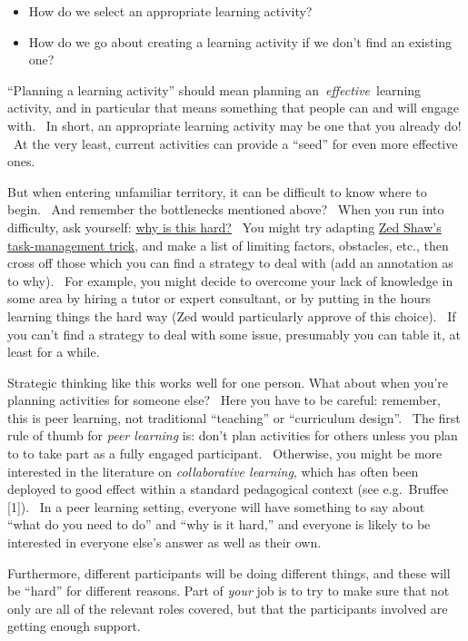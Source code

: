 \begin{itemize}
\tightlist
\item
  How do we select an appropriate learning activity?
\item
  How do we go about creating a learning activity if we don't find an
  existing one?
\end{itemize}

``Planning a learning activity'' should mean planning
an~\emph{effective}~learning activity, and in particular that means
something that people can and will engage with. ~In short, an
appropriate learning activity may be one that you already do! ~At the
very least, current activities can provide a ``seed'' for even more
effective ones.

But when entering unfamiliar territory, it can be difficult to know
where to begin.~ And remember the bottlenecks mentioned above?~ When you
run into difficulty, ask yourself:
\href{http://peeragogy.org/patterns-and-heuristics/}{why is this hard?}~
You might try adapting
\href{http://learnpythonthehardway.org/book/intro.html\#comment-409972596}{Zed
Shaw's task-management trick}, and make a list of limiting factors,
obstacles, etc., then cross off those which you can find a strategy to
deal with (add an annotation as to why). ~For example, you might decide
to overcome your lack of knowledge in some area by hiring a tutor or
expert consultant, or by putting in the hours learning things the hard
way (Zed would particularly approve of this choice).~ If you can't find
a strategy to deal with some issue, presumably you can table it, at
least for a while.

Strategic thinking like this works well for one person. What about when
you're planning activities for someone else? ~Here you have to be
careful: remember, this is peer learning, not traditional ``teaching''
or ``curriculum design''. ~The first rule of thumb for \emph{peer
learning} is: don't plan activities for others unless you plan to to
take part as a fully engaged participant.~ Otherwise, you might be more
interested in the literature on \emph{collaborative learning}, which has
often been deployed to good effect within a standard pedagogical context
(see e.g.~Bruffee {{[}1{]}}).~ In a peer learning setting, everyone will
have something to say about~ ``what do you need to do'' and ``why is it
hard,'' and everyone is likely to be interested in everyone else's
answer as well as their own.

Furthermore, different participants will be doing different things, and
these will be ``hard'' for different reasons. Part of \emph{your} job is
to try to make sure that not only are all of the relevant roles covered,
but that the participants involved are getting enough support.

